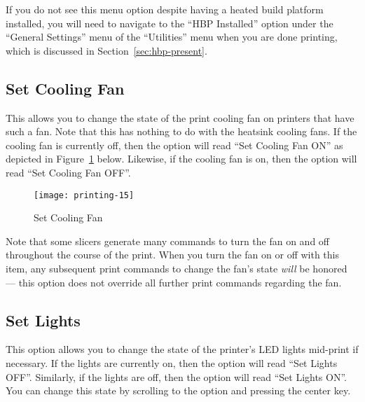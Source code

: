 If you do not see this menu option despite having a heated build platform installed, you will need to navigate to the ``HBP Installed'' option under the ``General Settings'' menu of the ``Utilities'' menu when you are done printing, which is discussed in Section~\ref{sec:hbp-present}.


\subsection{Set Cooling Fan}\label{sec:cooling}

This allows you to change the state of the \gls{print cooling fan} on printers that have such a fan.  Note that this has nothing to do with the \glspl{heatsink cooling fan}.  If the cooling fan is currently off, then the option will read ``Set Cooling Fan ON'' as depicted in Figure~\ref{fig:coolingfan} below.  Likewise, if the cooling fan is on, then the option will read ``Set Cooling Fan OFF''.

\begin{figure}[!htbp]
  \centering
    \texttt{[image: printing-15]}
    \caption{Set Cooling Fan}
  \label{fig:coolingfan}
\end{figure}

Note that some \glspl{slicer} generate many commands to turn the fan on and off throughout the course of the print.  When you turn the fan on or off with this item, any subsequent print commands to change the fan's state \emph{will} be honored --- this option does not override all further print commands regarding the fan.


\subsection{Set Lights}\label{sec:printsetlights}

This option allows you to change the state of the printer's LED lights mid-print if necessary. If the lights are currently on, then the option will read ``Set Lights OFF''. Similarly, if the lights are off, then the option will read ``Set Lights ON''. You can change this state by scrolling to the option and pressing the center key.


